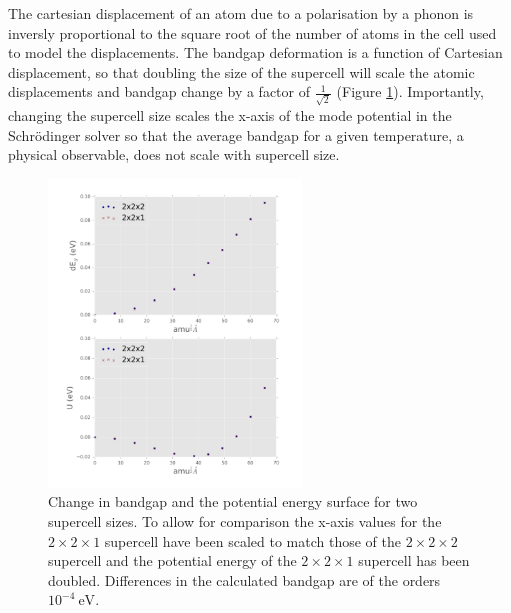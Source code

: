 
The cartesian displacement of an atom due to a polarisation by a phonon is inversly proportional to the square root of the number of atoms in the cell used to model the displacements.\autocite{Whalley2016} The bandgap deformation is a function of Cartesian displacement, so that doubling the size of the supercell will scale the atomic displacements and bandgap change by a factor of $\frac{1}{\sqrt{2}}$ (Figure \ref{ch5scaling}). 
Importantly, changing the supercell size scales the x-axis of the mode potential in the Schr\"{o}dinger solver so that the average bandgap for a given temperature, a physical observable, does not scale with supercell size.

\begin{figure}[h!]
\includegraphics[width=0.6\textwidth]{figures/ch5/SCcompare.png} \centering
\caption[Bandgap deformation potential and supercell size]{\label{ch5scaling}
Change in bandgap and the potential energy surface for two supercell sizes. To allow for comparison the x-axis values for the $2\times2\times1$ supercell have been scaled to match those of the $2\times2\times2$ supercell and the potential energy of the $2\times2\times1$ supercell has been doubled.  Differences in the calculated bandgap are of the orders $10^{−4}\ \textrm{eV}$.
}
\end{figure}

